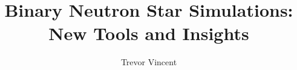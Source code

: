 

 
 \author{Trevor Vincent}
\title{Binary Neutron Star Simulations: New Tools and Insights}



%
\setcounter{tocdepth}{2}








